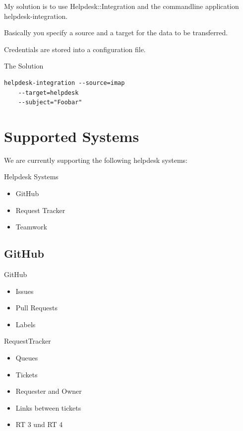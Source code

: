 My solution is to use Helpdesk::Integration and the commandline
application helpdesk-integration.

Basically you specify a source and a target for the data to be
transferred.

Credentials are stored into a configuration file.

\begin{frame}[fragile]{The Solution}
\begin{lstlisting}
helpdesk-integration --source=imap 
    --target=helpdesk 
    --subject="Foobar"
\end{lstlisting}
\end{frame}

\section{Supported Systems}

We are currently supporting the following helpdesk systems:

\begin{frame}{Helpdesk Systems}
\begin{itemize}
\item GitHub
\item Request Tracker
\item Teamwork
\end{itemize}
\end{frame}

\subsection{GitHub}


\begin{frame}{GitHub}
\begin{itemize}
\item Issues
\item Pull Requests
\item Labels
\end{itemize}
\end{frame}

\begin{frame}{RequestTracker}
\begin{itemize}
\item Queues
\item Tickets
\item Requester and Owner
\item Links between tickets
\item RT 3 und RT 4
\end{itemize}
\end{frame}

